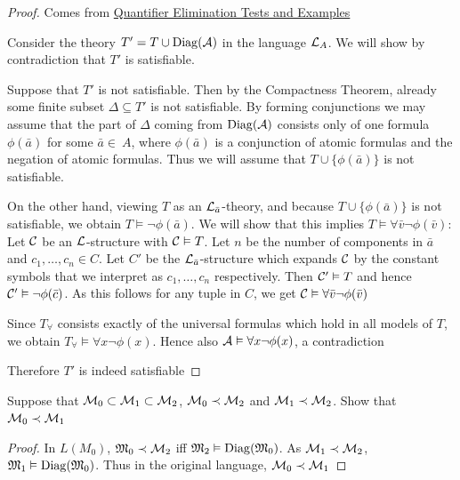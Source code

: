 \documentclass[11pt]{article}
\begin{document}
\begin{proof}
Comes from \href{http://www.math.uni-konstanz.de/\~eleftheriou/teaching/Masterarbeit.pdf}{Quantifier Elimination Tests and Examples}

Consider the theory \(T'=T\cup\operatorname{Diag}(\mathcal{A})\) in the language \(\mathcal{L}_A\). We
will show by contradiction that \(T'\) is satisfiable.

Suppose that \(T'\) is not satisfiable. Then by the Compactness Theorem,
already some finite subset \(\Delta\subseteq T'\) is not satisfiable. By forming
conjunctions we may assume that the part of \(\Delta\) coming from \(\operatorname{Diag}(\mathcal{A})\)
consists only of one formula \(\phi(\bar{a})\) for some \(\bar{a}\in\ A\), where
\(\phi(\bar{a})\) is a conjunction of atomic formulas and the negation of atomic
formulas. Thus we will assume that \(T\cup\{\phi(\bar{a})\}\) is not satisfiable.

On the other hand, viewing \(T\) as an \(\mathcal{L}_{\bar{a}}\)-theory, and because
\(T\cup\{\phi(\bar{a})\}\) is not satisfiable, we obtain
\(T\vDash\neg\phi(\bar{a})\). We will show that this implies
\(T\vDash\forall\bar{v}\neg\phi(\bar{v})\): Let \(\mathcal{C}\) be an
\(\mathcal{L}\)-structure with \(\mathcal{C}\vDash T\). Let \(n\) be the number of
components in \(\bar{a}\) and \(c_1,\dots,c_n\in C\). Let \(C'\) be the
\(\mathcal{L}_{\bar{a}}\)-structure which expands \(\mathcal{C}\) by the constant symbols
that we interpret as \(c_1,\dots,c_n\) respectively. Then \(\mathcal{C}'\vDash T\) and
hence \(\mathcal{C}'\vDash\neg\phi(\bar{c})\). As this follows for any tuple in
\(C\), we get \(\mathcal{C}\vDash\forall\bar{v}\neg\phi(\bar{v})\)

Since \(T_\forall\) consists exactly of the universal formulas which hold in all
models of \(T\), we obtain \(T_\forall\vDash\forall x\neg\phi(x)\). Hence also
\(\mathcal{A}\vDash\forall x\neg\phi(x)\), a contradiction

Therefore \(T'\) is indeed satisfiable
\end{proof}

\begin{exercise}
Suppose that \(\mathcal{M}_0\subset\mathcal{M}_1\subset\mathcal{M}_2\), \(\mathcal{M}_0\prec\mathcal{M}_2\) and \(\mathcal{M}_1\prec\mathcal{M}_2\). Show that \(\mathcal{M}_0\prec\mathcal{M}_1\)
\end{exercise}

\begin{proof}
In \(L(M_0)\), \(\mathfrak{M}_0\prec\mathcal{M}_2\) iff \(\mathfrak{M}_2\vDash\operatorname{Diag}(\mathfrak{M}_0)\). As \(\mathcal{M}_1\prec\mathcal{M}_2\), \(\mathfrak{M}_1\vDash\operatorname{Diag}(\mathfrak{M}_0)\). Thus in the
original language, \(\mathcal{M}_0\prec\mathcal{M}_1\)
\end{proof}
\end{document}
